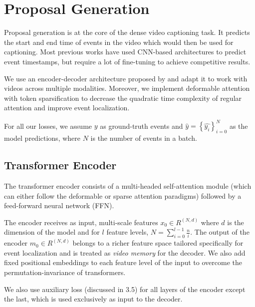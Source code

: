 \section{Proposal Generation}
\par Proposal generation is at the core of the dense video captioning task. It predicts the start and end time of events in the video which would then be used for captioning. Most previous works have used CNN-based architectures to predict event timestamps, but require a lot of fine-tuning to achieve competitive results.
\par We use an encoder-decoder architecture proposed by \cite{} and adapt it to work with videos across multiple modalities. Moreover, we implement deformable  attention \cite{zhu2020deformable} with token sparsification \cite{roh2021sparse} to decrease the quadratic time complexity of regular attention and improve event localization.
\par For all our losses, we assume $y$ as ground-truth events and $\hat{y}=\left \{ \hat{y_{i}} \right \}_{i=0}^{N}$ as the model predictions, where $N$ is the number of events in a batch.

\subsection{Transformer Encoder}
\par The transformer encoder consists of a multi-headed self-attention module (which can either follow the deformable or sparse attention paradigms) followed by a feed-forward neural network (FFN). 
\par The encoder receives as input, multi-scale features $x_{0} \in R^{(N , d)}$ where $d$ is the dimension of the model and for $l$ feature levels, $N = \sum_{i=0}^{l-1}\frac{n}{i}$. The output of the encoder $m_{0} \in R^{(N , d)}$ belongs to a richer feature space tailored specifically for event localization and is treated as \textit{video memory} for the decoder. We also add fixed positional embeddings to each feature level of the input to overcome the permutation-invariance of transformers. 
\par We also use auxiliary loss (discussed in 3.5) for all layers of the encoder except the last, which is used exclusively as input to the decoder.

